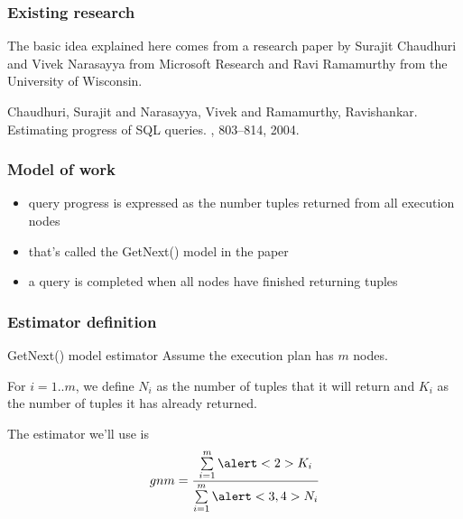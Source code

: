\documentclass{beamer}
\begin{document}
\begin{frame}
  \frametitle{Existing research}

  The basic idea explained here comes from a research paper by Surajit
  Chaudhuri and Vivek Narasayya from Microsoft Research and Ravi Ramamurthy
  from the University of Wisconsin.

  \bigskip

  \begin{thebibliography}{Chaudhuri 2004}

    Chaudhuri, Surajit and Narasayya, Vivek and Ramamurthy, Ravishankar.
    \newblock Estimating progress of SQL queries.
    , 803--814, 2004.

  \end{thebibliography}
\end{frame}

\begin{frame}
  \frametitle{Model of work}

  \begin{itemize}
  \item query progress is expressed as the number tuples returned from all
    execution nodes
  \item that's called the GetNext() model in the paper
  \item a query is completed when all nodes have finished returning tuples
  \end{itemize}
\end{frame}

\begin{frame}
  \frametitle{Estimator definition}

  \begin{block}{GetNext() model estimator}
    Assume the execution plan has $m$ nodes.

    \bigskip

    For $i = 1..m$, we define \alert<3>{$N_{i}$} as the number of tuples that
    it \alert<3>{will return} and \alert<2>{$K_{i}$} as the number of tuples it
    \alert<2>{has already returned}.

    \bigskip

    The estimator we'll use is
    \begin{equation*}
      gnm = \frac{\sum\limits_{i=1}^{m} \alert<2>{K_{i}}}
      {\sum\limits_{i=1}^{m} \alert<3,4>{N_{i}}}
    \end{equation*}

    \bigskip

  \end{block}
\end{frame}
\end{document}
